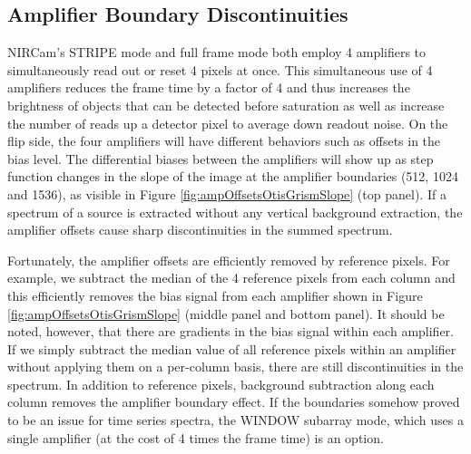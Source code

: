 \documentclass{aastex62}
\begin{document}
\subsection{Amplifier Boundary Discontinuities}

NIRCam's STRIPE mode and full frame mode both employ 4 amplifiers to simultaneously read out or reset 4 pixels at once.
This simultaneous use of 4 amplifiers reduces the frame time by a factor of 4 and thus increases the brightness of objects that can be detected before saturation as well as increase the number of reads up a detector pixel to average down readout noise.
On the flip side, the four amplifiers will have different behaviors such as offsets in the bias level.
The differential biases between the amplifiers will show up as step function changes in the slope of the image at the amplifier boundaries (512, 1024 and 1536), as visible in Figure \ref{fig:ampOffsetsOtisGrismSlope} (top panel).
If a spectrum of a source is extracted without any vertical background extraction, the amplifier offsets cause sharp discontinuities in the summed spectrum.

Fortunately, the amplifier offsets are efficiently removed by reference pixels.
For example, we subtract the median of the 4 reference pixels from each column and this efficiently removes the bias signal from each amplifier shown in Figure \ref{fig:ampOffsetsOtisGrismSlope} (middle panel and bottom panel).
It should be noted, however, that there are gradients in the bias signal within each amplifier. If we simply subtract the median value of all reference pixels within an amplifier without applying them on a per-column basis, there are still discontinuities in the spectrum.
In addition to reference pixels, background subtraction along each column removes the amplifier boundary effect.
If the boundaries somehow proved to be an issue for time series spectra, the WINDOW subarray mode, which uses a single amplifier (at the cost of 4 times the frame time) is an option.
\end{document}

